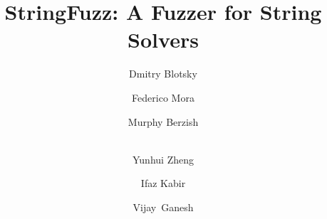 \documentclass[runningheads]{llncs}
\def\fuzzer{StringFuzz}
\begin{document}
    \title{\fuzzer{}: A Fuzzer for String Solvers}

   \author{
       Dmitry Blotsky \and
       Federico Mora \and
       Murphy Berzish \and \\
       Yunhui Zheng \and
       Ifaz Kabir \and
       Vijay~Ganesh
   }


    \maketitle

    
    
    
    
    
    

    
    
\end{document}
